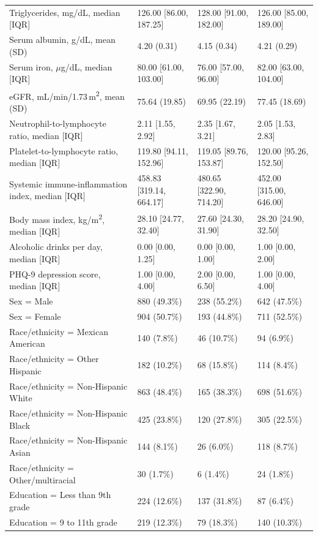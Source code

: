 \documentclass[12pt]{article}
\begin{document}
\begin{singlespace}
\begin{longtable}{L{4.6cm}R{3.35cm}R{3.35cm}R{3.35cm}}
Triglycerides, mg/dL, median [IQR] & 126.00 [86.00, 187.25] & 128.00 [91.00, 182.00] & 126.00 [85.00, 189.00] \\
Serum albumin, g/dL, mean (SD) & 4.20 (0.31) & 4.15 (0.34) & 4.21 (0.29) \\
Serum iron, $\mu$g/dL, median [IQR] & 80.00 [61.00, 103.00] & 76.00 [57.00, 96.00] & 82.00 [63.00, 104.00] \\
eGFR, mL/min/1.73\,m\textsuperscript{2}, mean (SD) & 75.64 (19.85) & 69.95 (22.19) & 77.45 (18.69) \\
Neutrophil-to-lymphocyte ratio, median [IQR] & 2.11 [1.55, 2.92] & 2.35 [1.67, 3.21] & 2.05 [1.53, 2.83] \\
Platelet-to-lymphocyte ratio, median [IQR] & 119.80 [94.11, 152.96] & 119.05 [89.76, 153.87] & 120.00 [95.26, 152.50] \\
Systemic immune-inflammation index, median [IQR] & 458.83 [319.14, 664.17] & 480.65 [322.90, 714.20] & 452.00 [315.00, 646.00] \\
Body mass index, kg/m\textsuperscript{2}, median [IQR] & 28.10 [24.77, 32.40] & 27.60 [24.30, 31.90] & 28.20 [24.90, 32.50] \\
Alcoholic drinks per day, median [IQR] & 0.00 [0.00, 1.25] & 0.00 [0.00, 1.00] & 1.00 [0.00, 2.00] \\
PHQ-9 depression score, median [IQR] & 1.00 [0.00, 4.00] & 2.00 [0.00, 6.50] & 1.00 [0.00, 4.00] \\
Sex = Male & 880 (49.3\%) & 238 (55.2\%) & 642 (47.5\%) \\
Sex = Female & 904 (50.7\%) & 193 (44.8\%) & 711 (52.5\%) \\
Race/ethnicity = Mexican American & 140 (7.8\%) & 46 (10.7\%) & 94 (6.9\%) \\
Race/ethnicity = Other Hispanic & 182 (10.2\%) & 68 (15.8\%) & 114 (8.4\%) \\
Race/ethnicity = Non-Hispanic White & 863 (48.4\%) & 165 (38.3\%) & 698 (51.6\%) \\
Race/ethnicity = Non-Hispanic Black & 425 (23.8\%) & 120 (27.8\%) & 305 (22.5\%) \\
Race/ethnicity = Non-Hispanic Asian & 144 (8.1\%) & 26 (6.0\%) & 118 (8.7\%) \\
Race/ethnicity = Other/multiracial & 30 (1.7\%) & 6 (1.4\%) & 24 (1.8\%) \\
Education = Less than 9th grade & 224 (12.6\%) & 137 (31.8\%) & 87 (6.4\%) \\
Education = 9 to 11th grade & 219 (12.3\%) & 79 (18.3\%) & 140 (10.3\%) \\

\end{longtable}
\end{singlespace}
\end{document}
